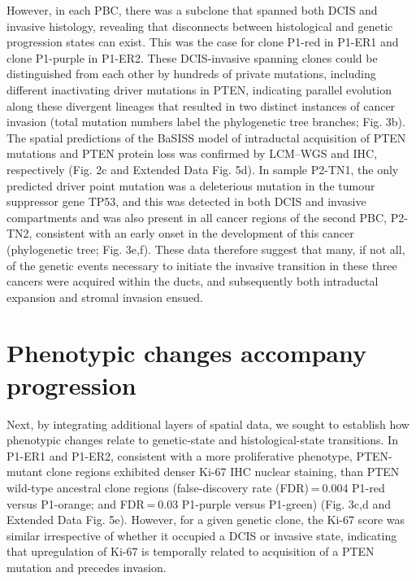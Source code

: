 However, in each PBC, there was a subclone that spanned both DCIS and invasive histology, revealing that disconnects between histological and genetic progression states can exist. This was the case for clone P1-red in P1-ER1 and clone P1-purple in P1-ER2. These DCIS-invasive spanning clones could be distinguished from each other by hundreds of private mutations, including different inactivating driver mutations in PTEN, indicating parallel evolution along these divergent lineages that resulted in two distinct instances of cancer invasion (total mutation numbers label the phylogenetic tree branches; Fig. 3b). The spatial predictions of the BaSISS model of intraductal acquisition of PTEN mutations and PTEN protein loss was confirmed by LCM–WGS and IHC, respectively (Fig. 2c and Extended Data Fig. 5d). In sample P2-TN1, the only predicted driver point mutation was a deleterious mutation in the tumour suppressor gene TP53, and this was detected in both DCIS and invasive compartments and was also present in all cancer regions of the second PBC, P2-TN2, consistent with an early onset in the development of this cancer (phylogenetic tree; Fig. 3e,f). These data therefore suggest that many, if not all, of the genetic events necessary to initiate the invasive transition in these three cancers were acquired within the ducts, and subsequently both intraductal expansion and stromal invasion ensued.

\section{Phenotypic changes accompany progression}

Next, by integrating additional layers of spatial data, we sought to establish how phenotypic changes relate to genetic-state and histological-state transitions. In P1-ER1 and P1-ER2, consistent with a more proliferative phenotype, PTEN-mutant clone regions exhibited denser Ki-67 IHC nuclear staining, than PTEN wild-type ancestral clone regions (false-discovery rate (FDR) = 0.004 P1-red versus P1-orange; and FDR = 0.03 P1-purple versus P1-green) (Fig. 3c,d and Extended Data Fig. 5e). However, for a given genetic clone, the Ki-67 score was similar irrespective of whether it occupied a DCIS or invasive state, indicating that upregulation of Ki-67 is temporally related to acquisition of a PTEN mutation and precedes invasion.

